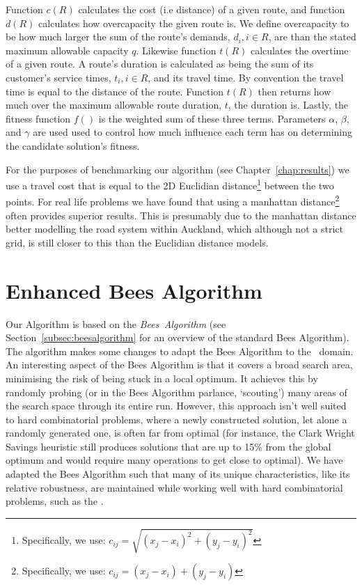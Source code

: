 Function $c(R)$ calculates the cost (i.e distance) of a given route, and function $d(R)$ calculates how overcapacity the given route is. We define overcapacity to be how much larger the sum of the route's demands, $d_i, i \in R$, are than the stated maximum allowable capacity $q$. Likewise function $t(R)$ calculates the overtime of a given route. A route's duration is calculated as being the sum of its customer's service times, $t_i, i \in R$, and its travel time. By convention the travel time is equal to the distance of the route. Function $t(R)$ then returns how much over the maximum allowable route duration, $t$, the duration is. Lastly, the fitness function $f()$ is the weighted sum of these three terms. Parameters $\alpha$, $\beta$, and $\gamma$ are used used to control how much influence each term has on determining the candidate solution's fitness.

For the purposes of benchmarking our algorithm (see Chapter~\ref{chap:results}) we use a travel cost that is equal to the 2D Euclidian distance\footnote{Specifically, we use: $c_{ij} = \sqrt{(x_j-x_i)^2 + (y_j-y_i)^2}$} between the two points. For real life problems we have found that using a manhattan distance\footnote{Specifically, we use: $c_{ij} = (x_j-x_i) + (y_j-y_i)$} often provides superior results. This is presumably due to the manhattan distance better modelling the road system within Auckland, which although not a strict grid, is still closer to this than the Euclidian distance models.

\section{Enhanced Bees Algorithm}
\label{sec:enhancedbeesalgorithm}

Our Algorithm is based on the \emph{Bees~Algorithm} (see Section~\ref{subsec:beesalgorithm} for an overview of the standard Bees Algorithm). The algorithm makes some changes to adapt the Bees Algorithm to the \VRP\ domain. An interesting aspect of the Bees Algorithm is that it covers a broad search area, minimising the risk of being stuck in a local optimum. It achieves this by randomly probing (or in the Bees Algorithm parlance, `scouting') many areas of the search space through its entire run. However, this approach isn't well suited to hard combinatorial problems, where a newly constructed solution, let alone a randomly generated one, is often far from optimal (for instance, the Clark Wright Savings heuristic still produces solutions that are up to 15\% from the global optimum and would require many operations to get close to optimal). We have adapted the Bees Algorithm such that many of its unique characteristics, like its relative robustness, are maintained while working well with hard combinatorial problems, such as the \VRP.

